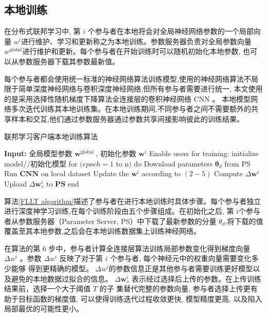 \subsection{本地训练}
在分布式联邦学习中, 第 $i$ 个参与者在本地将会对全局神经网络参数的一个局部向量 $w^{i}$进行维护、学习和更新称之为本地训练。参数服务器负责对全局参数向量 $w^{g l o b a l}$进行维护和更新。每个参与者在开始训练时可以随机初始化本地参数, 也可以从参数服务器下载其参数最新值。

每个参与者都会使用统一标准的神经网络算法训练模型,使用的神经网络算法不局限于简单深度神经网络与卷积深度神经网络,但所有参与者需要进行统一, 本文使用的是采用选择性随机梯度下降算法全连接层的卷积神经网络 $\mathrm{CNN}$ 。 本地模型网络多次迭代训练其本地训练集。在本地训练期间,不同参与者之间不需要额外的共享样本和交互,他们通过参数服务器通过参数共享间接影响彼此的训练结果。

\begin{algorithm}[!htb]
	\caption{联邦学习客户端本地训练算法}
	\label{FLLT algorithm}
	\begin{algorithmic}[1]
		\footnotesize
		\STATE \textbf{Input:} 全局模型参数 $\boldsymbol{w}^{\text {global }}$, 初始化参数 $\boldsymbol{w}^{i}$
	    \STATE Enable users for training: initialize model//初始化模型 
	    \STATE for $(e p o c h=1$ to $\mathrm{n})$ do
	    \STATE Download parameters $\boldsymbol{\theta}_{d}$ from PS
	    \STATE Run $\boldsymbol{CNN}$ on local dataset
	    \STATE Update the $\boldsymbol{w}^{i}$ according to $(2-5)$
	    \STATE Compute $\Delta \boldsymbol{w}^{i}$
		\STATE Upload $\Delta \boldsymbol{w}_{s}^{i}$ to $\mathbf{P S}$
		\STATE end
	\end{algorithmic}
\end{algorithm}

算法\ref{FLLT algorithm}描述了参与者在进行本地训练时具体步骤。每个参与者独立进行深度神学习训练,在每个训练阶段由五个步骤组成。在初始化之后, 第 $i$个参与者从参数服务器（Parameter Server, PS）中下载了最新参数的分量 $\theta_{d}$,将下载的值覆盖至其本地参数,之后会在本地训练数据集上训练神经网络。

在算法的第 6 步中，参与者计算全连接层算法训练局部参数变化得到梯度向量 $\Delta w^{i}$ 。参数 $\Delta w^{i}$ 反映了对于第 $i$ 个参与者, 每个神经元中的权重向量需要变化多少能够 得到更精确的模型。 $\Delta w^{i}$的参数信息正是其他参与者需要训练更好模型以及避免的本地数据过拟合的信息。
$\Delta \boldsymbol{w}_{s}^{i}$ 表示经过选择后上传的参数。在上传训练结果前，选择一个大于阈值 $T$ 的子 集替代完整的参数向量, 参与者选择上传更有助于目标函数的梯度值, 可以使得训练迭代过程收敛更快, 模型精度更高, 以及陷入局部最优的可能性更小。

